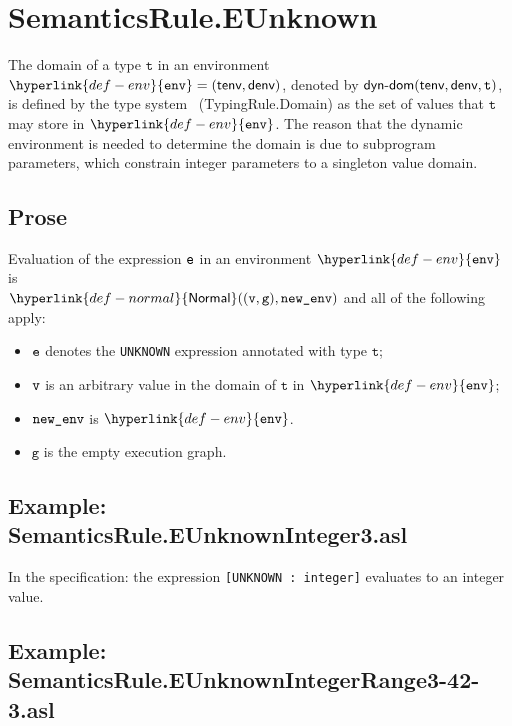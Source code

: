 \documentclass{book}
\newcommand\Normal[0]{\hyperlink{def-normal}{\textsf{Normal}}}
\newcommand\env[0]{\hyperlink{def-env}{\texttt{env}}}
\newcommand\vg[0]{\texttt{g}}
\newcommand\vt[0]{\texttt{t}}
\begin{document}

\section{SemanticsRule.EUnknown \label{sec:SemanticsRule.EUnknown}}
  \begin{definition}
  The domain of a type $\vt$ in an environment $\env=(\tenv,\denv)$,
  denoted by $\textsf{dyn-dom}(\tenv, \denv, \vt)$, is defined by the type system~\cite{ASLTypingReference}
  (TypingRule.Domain)
  as the set of values that $\vt$ may store in $\env$. The reason that the dynamic environment is
  needed to determine the domain is due to subprogram parameters, which constrain integer parameters to
  a singleton value domain.
  \end{definition}

  \subsection{Prose}
  Evaluation of the expression $\texttt{e}$ in an environment $\env$ is \\
  $\Normal((\vv, \vg), \newenv)$ and all of the following apply:
  \begin{itemize}
  \item $\texttt{e}$ denotes the \texttt{UNKNOWN} expression annotated with type $\vt$;
  \item $\texttt{v}$ is an arbitrary value in the domain of $\vt$ in $\env$;
  \item $\texttt{new\_env}$ is $\env$.
  \item $\vg$ is the empty execution graph.
  \end{itemize}

  \subsection{Example: SemanticsRule.EUnknownInteger3.asl}
    In the specification:
    the expression \texttt{[UNKNOWN : integer]} evaluates to an integer value.

  \subsection{Example: \\ SemanticsRule.EUnknownIntegerRange3-42-3.asl}
\end{document}

